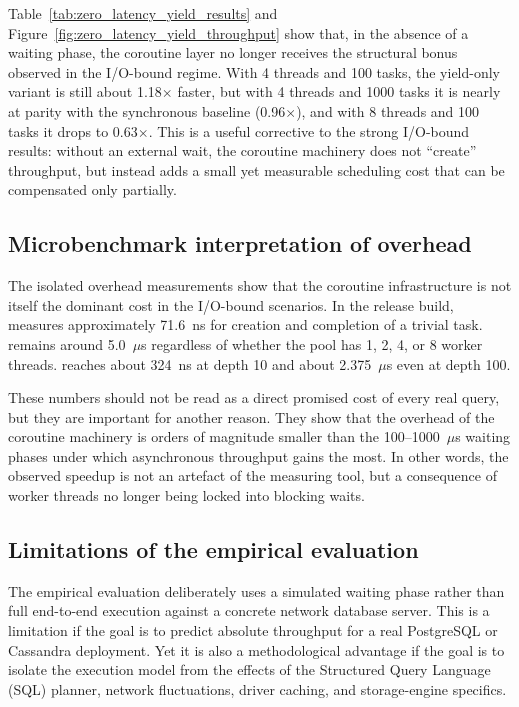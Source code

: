 Table~\ref{tab:zero_latency_yield_results} and Figure~\ref{fig:zero_latency_yield_throughput} show that, in the absence of a waiting phase, the coroutine layer no longer receives the structural bonus observed in the I/O-bound regime. With 4 threads and 100 tasks, the yield-only variant is still about 1.18$\times$ faster, but with 4 threads and 1000 tasks it is nearly at parity with the synchronous baseline (0.96$\times$), and with 8 threads and 100 tasks it drops to 0.63$\times$. This is a useful corrective to the strong I/O-bound results: without an external wait, the coroutine machinery does not “create” throughput, but instead adds a small yet measurable scheduling cost that can be compensated only partially.

\subsection{Microbenchmark interpretation of overhead}

The isolated overhead measurements show that the coroutine infrastructure is not itself the dominant cost in the I/O-bound scenarios. In the release build,  measures approximately 71.6~ns for creation and completion of a trivial task.  remains around 5.0~$\mu$s regardless of whether the pool has 1, 2, 4, or 8 worker threads.  reaches about 324~ns at depth 10 and about 2.375~$\mu$s even at depth 100.

These numbers should not be read as a direct promised cost of every real query, but they are important for another reason. They show that the overhead of the coroutine machinery is orders of magnitude smaller than the 100--1000~$\mu$s waiting phases under which asynchronous throughput gains the most. In other words, the observed speedup is not an artefact of the measuring tool, but a consequence of worker threads no longer being locked into blocking waits.

\subsection{Limitations of the empirical evaluation}

The empirical evaluation deliberately uses a simulated waiting phase rather than full end-to-end execution against a concrete network database server. This is a limitation if the goal is to predict absolute throughput for a real PostgreSQL or Cassandra deployment. Yet it is also a methodological advantage if the goal is to isolate the execution model from the effects of the Structured Query Language (SQL) planner, network fluctuations, driver caching, and storage-engine specifics.

